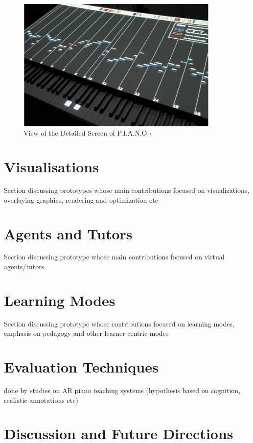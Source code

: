 \documentclass{article}
\begin{document}
\begin{figure}
    \centering
    \includegraphics[width=10cm]{figures/piano}
    \caption{View of the Detailed Screen of P.I.A.N.O.› }
    \label{fig:View from the HeadMounted}
\end{figure}



\section{Visualisations}
Section discussing prototypes whose main contributions focused on visualizations, overlaying graphics, rendering and optimization etc


\section{Agents and Tutors}
Section discussing prototype whose main contributions focused on virtual agents/tutors 

\section{Learning Modes}
Section discussing prototype whose contributions focused on learning modes, emphasis on pedagogy and other learner-centric modes

\section{Evaluation Techniques}
done by studies on AR piano teaching systems (hypothesis based on cognition, realistic annotations etc)

\section{Discussion and Future Directions}
\end{document}
